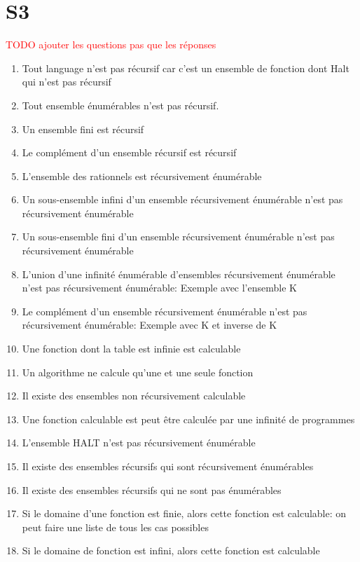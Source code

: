 \documentclass{report}
\begin{document}
\section{S3}
\textcolor{red}{TODO ajouter les questions pas que les réponses}

\begin{enumerate}
\item Tout language n'est pas récursif car c'est un ensemble de fonction dont Halt qui n'est pas récursif
\item Tout ensemble énumérables n'est pas récursif.
\item Un ensemble fini est récursif
\item Le complément d'un ensemble récursif est récursif
\item L'ensemble des rationnels est récursivement énumérable
\item Un sous-ensemble infini d'un ensemble récursivement énumérable n'est pas récursivement énumérable
\item Un sous-ensemble fini d'un ensemble récursivement énumérable n'est pas récursivement énumérable
\item L’union d’une infinité énumérable d’ensembles récursivement énumérable n'est pas récursivement énumérable: Exemple avec l'ensemble K
\item Le complément d’un ensemble récursivement énumérable n'est  pas récursivement énumérable: Exemple avec K et inverse de K
\item Une fonction dont la table est infinie est calculable
\item Un algorithme ne calcule qu'une et une seule fonction
\item Il existe des ensembles non récursivement calculable
\item Une fonction calculable est peut être calculée par une infinité de programmes
\item L'ensemble HALT n'est pas récursivement énumérable
\item Il existe des ensembles récursifs qui sont récursivement énumérables
\item Il existe des ensembles récursifs qui ne sont pas énumérables
\item Si le domaine d'une fonction est finie, alors cette fonction est calculable: on peut faire une liste de tous les cas possibles
\item Si le domaine de fonction est infini, alors cette fonction est calculable
\end{enumerate}
\end{document}

